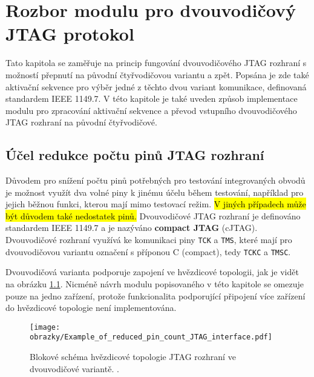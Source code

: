 \chapter{Rozbor modulu pro dvouvodičový \acs{JTAG} protokol}
Tato kapitola se zaměřuje na princip fungování dvouvodičového \acs{JTAG} rozhraní s možností přepnutí na původní čtyřvodičovou variantu a zpět. Popsána je zde také aktivační sekvence pro výběr jedné z těchto dvou variant komunikace, definovaná standardem IEEE 1149.7. V této kapitole je také uveden způsob implementace modulu pro zpracování aktivační sekvence a převod vstupního dvouvodičového \acs{JTAG} rozhraní na původní čtyřvodičové. %
	
\section{Účel redukce počtu pinů \acs{JTAG} rozhraní}	\label{sec:2w_interface}
Důvodem pro snížení počtu pinů potřebných pro testování integrovaných obvodů je možnost využít dva volné piny k jinému účelu během testování, například pro jejich běžnou funkci, kterou mají mimo testovací režim. \hl{V jiných případech může být důvodem také nedostatek pinů.} Dvouvodičové \acs{JTAG} rozhraní je definováno standardem IEEE 1149.7 a je nazýváno \textbf{compact \acs{JTAG}} (c\acs{JTAG}). Dvouvodičové rozhraní využívá ke komunikaci piny \texttt{\acs{TCK}} a \texttt{\acs{TMS}}, které mají pro dvouvodičovou variantu označení s příponou C (compact), tedy \texttt{\acs{TCKC}} a \texttt{\acs{TMSC}}. \cite{IEEE_1149-7} \cite{JTAG}

Dvouvodičová varianta podporuje zapojení ve hvězdicové topologii, jak je vidět na obrázku \ref{fig:star2_sch}. Nicméně návrh modulu popisovaného v této kapitole se omezuje pouze na jedno zařízení, protože funkcionalita podporující připojení více zařízení do hvězdicové topologie není implementována.

\begin{figure}[!h]
  \begin{center}
    \texttt{[image: obrazky/Example\_of\_reduced\_pin\_count\_JTAG\_interface.pdf]}
  \end{center}
  \caption{Blokové schéma hvězdicové topologie \acs{JTAG} rozhraní ve dvouvodičové variantě. \cite{JTAG}.}
	\label{fig:star2_sch}
\end{figure}


